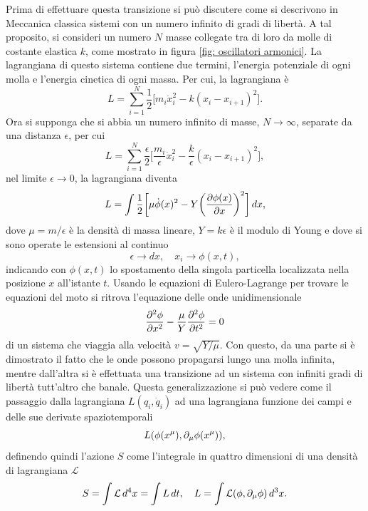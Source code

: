 Prima di effettuare questa transizione si può discutere come si descrivono in Meccanica classica sistemi con un numero infinito di gradi di libertà. A tal proposito, si consideri un numero $N$ masse collegate tra di loro da molle di costante elastica $k$, come mostrato in figura \ref{fig: oscillatori armonici}. La lagrangiana di questo sistema contiene due termini, l'energia potenziale di ogni molla e l'energia cinetica di ogni massa. Per cui, la lagrangiana è
\begin{equation}
    L = \sum_{i = 1}^{N}\frac{1}{2}\bigg[m_i\dot{x}_i^2 - k(x_i - x_{i+1})^2\bigg].
\end{equation}
Ora si supponga che si abbia un numero infinito di masse, $N\to\infty$, separate da una distanza $\epsilon$, per cui 
\begin{equation}
    L = \sum_{i = 1}^{N}\frac{\epsilon}{2}\bigg[\frac{m_i}{\epsilon}\dot{x}_i^2 - \frac{k}{\epsilon}(x_i - x_{i+1})^2\bigg],
\end{equation}
nel limite $\epsilon\to0$, la lagrangiana diventa
\begin{equation}
    L = \int\frac{1}{2}\bigg[\mu\dot{\phi}(x)^2 - Y\bigg(\frac{\partial\phi(x)}{\partial x}\bigg)^2\bigg]\,dx,
\end{equation}
dove $\mu = m/\epsilon$ è la densità di massa lineare, $Y = k\epsilon$ è il modulo di Young e dove si sono operate le estensioni al continuo
\begin{equation}
    \epsilon \to dx,\quad x_i \to \phi(x,t),
\end{equation}
indicando con $\phi(x,t)$ lo spostamento della singola particella localizzata nella posizione $x$ all'istante $t$. Usando le equazioni di Eulero-Lagrange per trovare le equazioni del moto si ritrova l'equazione delle onde unidimensionale 
\begin{equation}
    \frac{\partial^2\phi}{\partial x^2} - \frac{\mu}{Y}\frac{\partial^2\phi}{\partial t^2} = 0
\end{equation}
di un sistema che viaggia alla velocità $v = \sqrt{Y/\mu}$. Con questo, da una parte si è dimostrato il fatto che le onde possono propagarsi lungo una molla infinita, mentre dall'altra si è effettuata una transizione ad un sistema con infiniti gradi di libertà tutt'altro che banale. Questa generalizzazione si può vedere come il passaggio dalla lagrangiana $L(q_i,\dot{q}_i)$ ad una lagrangiana funzione dei campi e delle sue derivate spaziotemporali
\begin{equation}
    L(\phi(x^\mu),\partial_\mu\phi(x^\mu)),
\end{equation}
definendo quindi l'azione $S$ come l'integrale in quattro dimensioni di una densità di lagrangiana $\mathcal{L}$
\begin{equation}
\label{eq: azione}
    S = \int\mathcal{L}\,d^4x = \int L\,dt,\quad L = \int\mathcal{L}(\phi,\partial_\mu\phi)\,d^3x.
\end{equation}

